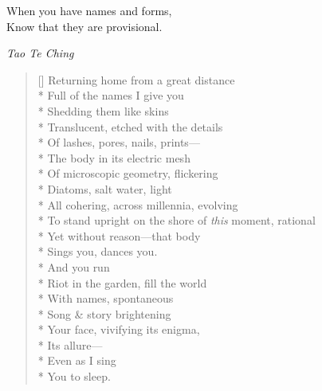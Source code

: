 \epigraph{When you have names and forms,\\ Know that they are provisional.}{\textit{Tao Te Ching}}

\label{ch:child}
\settowidth{\versewidth}{To stand upright on the shore of this moment, rational}
\begin{verse}[\versewidth]
Returning home from a great distance\\*
Full of the names I give you\\*
Shedding them like skins\\*
Translucent, etched with the details\\*
Of lashes, pores, nails, prints---\\*
The body in its electric mesh\\*
Of microscopic geometry, flickering\\*
Diatoms, salt water, light\\*
All cohering, across millennia, evolving\\*
To stand upright on the shore of \textit{this} moment, rational\\*
Yet without reason---that body\\*
Sings you, dances you.\\*
\hspace*{4\vgap} And you run\\*
Riot in the garden, fill the world\\*
With names, spontaneous\\*
Song \& story brightening \\*
Your face, vivifying its enigma,\\*
Its allure---\\*
\hspace*{3\vgap} Even as I sing\\*
You to sleep.
\end{verse}
